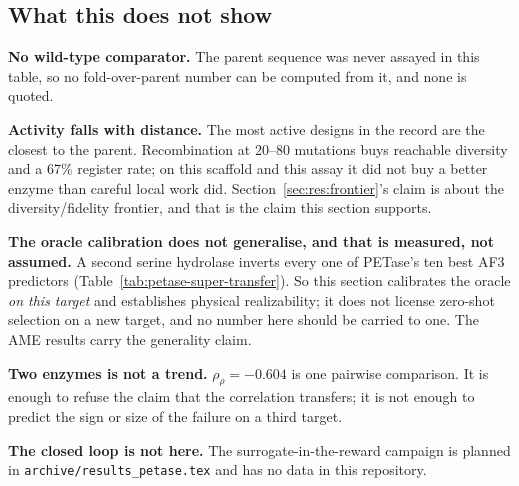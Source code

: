 \subsection*{What this does not show}

\begin{planlist}
  \item \textbf{No wild-type comparator.} The parent sequence was never assayed
        in this table, so no fold-over-parent number can be computed from it,
        and none is quoted.
  \item \textbf{Activity falls with distance.} The most active designs in the
        record are the closest to the parent. Recombination at 20--80 mutations
        buys reachable diversity and a 67\% register rate; on this scaffold and
        this assay it did not buy a better enzyme than careful local work did.
        Section~\ref{sec:res:frontier}'s claim is about the diversity/fidelity
        frontier, and that is the claim this section supports.
  \item \textbf{The oracle calibration does not generalise, and that is
        measured, not assumed.} A second serine hydrolase inverts every one of
        PETase's ten best AF3 predictors
        (Table~\ref{tab:petase-super-transfer}). So this section calibrates the
        oracle \emph{on this target} and establishes physical realizability; it
        does not license zero-shot selection on a new target, and no number here
        should be carried to one. The AME results carry the generality claim.
  \item \textbf{Two enzymes is not a trend.} $\rho_{\rho} = -0.604$ is one
        pairwise comparison. It is enough to refuse the claim that the
        correlation transfers; it is not enough to predict the sign or size of
        the failure on a third target.
  \item \textbf{The closed loop is not here.} The surrogate-in-the-reward
        campaign is planned in \texttt{archive/results\_petase.tex} and has no
        data in this repository.
\end{planlist}
